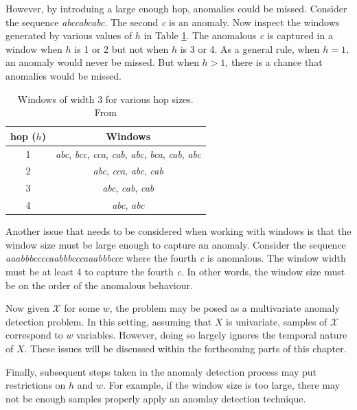 However, by introduing a large enough hop, anomalies could be missed. Consider the sequence \emph{abccabcabc}. The second \emph{c} is an anomaly. Now inspect the windows generated by various values of $h$ in Table \ref{tbl:hop}. The anomalous \emph{c} is captured in a window when $h$ is 1 or 2 but not when $h$ is 3 or 4. As a general rule, when $h=1$, an anomaly would never be missed. But when $h>1$, there is a chance that anomalies would be missed.

\begin{table}[h]
  \centering
  \begin{tabular}{|c|c|}
    \hline
    hop ($h$) & Windows \\
    \hline
    \hline
    1 & \emph{abc},
        \emph{bcc}, 
        \emph{cca}, 
        \emph{cab},
        \emph{abc}, 
        \emph{bca},
        \emph{cab},
        \emph{abc} \\
    \hline
    2 & \emph{abc},
        \emph{cca},
        \emph{abc},
        \emph{cab} \\
    \hline
    3 & \emph{abc}, 
        \emph{cab},
        \emph{cab} \\
    \hline
    4 & \emph{abc}, 
        \emph{abc} \\
    \hline
  \end{tabular}
  \caption{Windows of width 3 for various hop sizes. From \cite{Cheboli2010}}
  \label{tbl:hop}
\end{table}

Another issue that needs to be considered when working with windows is that the window size must be large enough to capture an anomaly. Consider the sequence \emph{aaabbbccccaabbbcccaaabbbccc} where the fourth \emph{c} is anomalous. The window width must be at least 4 to capture the fourth \emph{c}. In other words, the window size must be on the order of the anomalous behaviour.

Now given $\mathcal{X}$ for some $w$, the problem may be posed as a multivariate anomaly detection problem. In this setting, assuming that $X$ is univariate, samples of $\mathcal{X}$ correspond to $w$ variables. However, doing so largely ignores the temporal nature of $X$. These issues will be discussed within the forthcoming parts of this chapter.

Finally, subsequent steps taken in the anomaly detection process may put restrictions on $h$ and $w$. For example, if the window size is too large, there may not be enough samples properly apply an anomlay detection technique.

